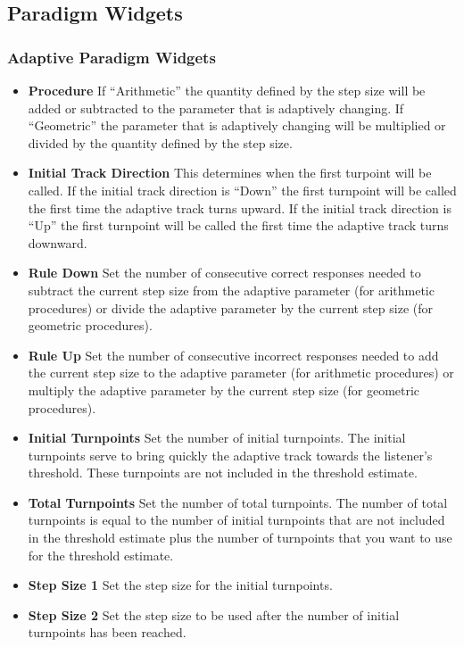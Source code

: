 \subsection{Paradigm Widgets}
\subsubsection{Adaptive Paradigm Widgets}

\begin{itemize}
\item \textbf{Procedure} If ``Arithmetic'' the quantity defined by the step size will be added or subtracted to the parameter that is adaptively changing. 
  If ``Geometric'' the parameter that is adaptively changing will be multiplied or divided by the quantity defined by the step size.
\item \textbf{Initial Track Direction} This determines when the first turpoint will be called. If the initial track direction is ``Down'' the first turnpoint will be called
  the first time the adaptive track turns upward. If the initial track direction is ``Up'' the first turnpoint will be called
  the first time the adaptive track turns downward.
\item \textbf{Rule Down} Set the number of consecutive correct responses needed to subtract the current step size from the adaptive parameter (for arithmetic procedures) or divide
  the adaptive parameter by the current step size (for geometric procedures).
\item \textbf{Rule Up} Set the number of consecutive incorrect responses needed to add the current step size to the adaptive parameter (for arithmetic procedures) 
  or multiply the adaptive parameter by the current step size (for geometric procedures).
\item \textbf{Initial Turnpoints} Set the number of initial turnpoints. The initial turnpoints serve to bring quickly the adaptive track towards the listener's threshold.
  These turnpoints are not included in the threshold estimate. 
\item \textbf{Total Turnpoints} Set the number of total turnpoints. The number of total turnpoints is equal to the number of initial turnpoints that are not included in the threshold estimate
  plus the number of turnpoints that you want to use for the threshold estimate.
\item \textbf{Step Size 1} Set the step size for the initial turnpoints.
\item \textbf{Step Size 2} Set the step size to be used after the number of initial turnpoints has been reached.
\end{itemize}



